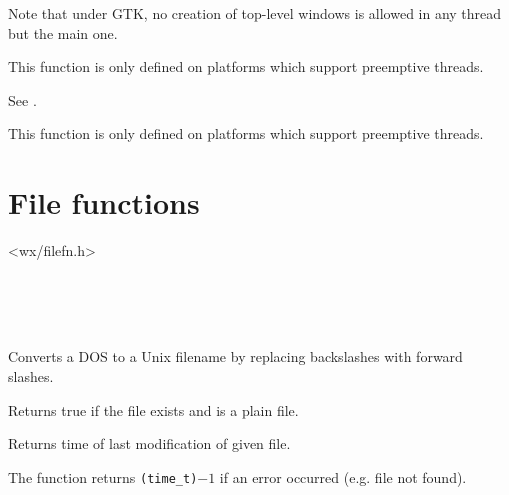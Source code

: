 Note that under GTK, no creation of top-level windows is allowed in any
thread but the main one.

This function is only defined on platforms which support preemptive
threads.


\label{wxmutexguileave}


See .

This function is only defined on platforms which support preemptive
threads.



\section{File functions}\label{filefunctions}


<wx/filefn.h>


\\
\\
\\


\label{wxdos2unixfilename}


Converts a DOS to a Unix filename by replacing backslashes with forward
slashes.


\label{functionwxfileexists}


Returns true if the file exists and is a plain file.


\label{wxfilemodificationtime}


Returns time of last modification of given file.

The function returns \texttt{(time\_t)}$-1$ if an error occurred (e.g. file not
found).


\label{wxfilenamefrompath}


